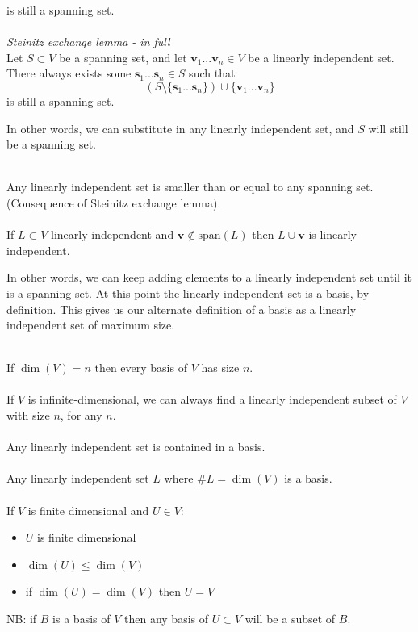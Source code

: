 \documentclass{scrartcl}
\renewcommand{\vec}[1]{\mathbf{#1}}
\begin{document}
is still a spanning set.
\\\\
\textit{Steinitz exchange lemma - in full}
\\
Let $ S \subset V $ be a spanning set, and let $ \vec{v}_{1}...\vec{v}_{n} \in V $ be a linearly independent set. There always exists some $ \vec{s}_{1}...\vec{s}_{n} \in S $ such that
\begin{equation}
(S \setminus \{\vec{s}_{1}...\vec{s}_{n}\}) \cup \{\vec{v}_{1}...\vec{v}_{n}\}
\end{equation}
is still a spanning set.
\\
\begin{tcolorbox}[breakable]
In other words, we can substitute in any linearly independent set, and $ S $ will still be a spanning set.
\end{tcolorbox}
\noindent
\\
Any linearly independent set is smaller than or equal to any spanning set. (Consequence of Steinitz exchange lemma).
\\\\
If $ L \subset V $ linearly independent and $ \vec{v} \notin \textrm{span}(L) $ then $ L \cup {\vec{v}} $ is linearly independent.
\\
\begin{tcolorbox}[breakable]
In other words, we can keep adding elements to a linearly independent set until it is a spanning set. At this point the linearly independent set is a basis, by definition. This gives us our alternate definition of a basis as a linearly independent set of maximum size.
\end{tcolorbox}
\noindent
\\
If $ \dim(V) = n $ then every basis of $ V $ has size $ n $.
\\\\
If $ V $ is infinite-dimensional, we can always find a linearly independent subset of $ V $ with size $ n $, for any $ n $.
\\\\
Any linearly independent set is contained in a basis.
\\\\
Any linearly independent set $ L $ where $ \#L = \dim(V) $ is a basis.
\\\\
If $ V $ is finite dimensional and $ U \in V $:
\begin{itemize}
\item $ U $ is finite dimensional
\item $ \dim(U) \leq \dim(V) $
\item if $ \dim(U) = \dim(V) $ then $ U = V $
\end{itemize}
\begin{tcolorbox}[breakable]
NB: if $ B $ is a basis of $ V $ then any basis of $ U \subset V $ will be a subset of $ B $.
\end{tcolorbox}
\end{document}
